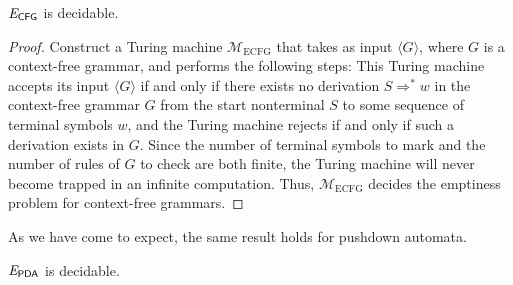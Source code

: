 \begin{theorem}\label{thm:ECFGdecidable}
$\mathit{E}_{\textsf{CFG}}$ is decidable.

\begin{proof}
Construct a Turing machine $\mathcal{M}_{\mathrm{ECFG}}$ that takes as input $\langle G \rangle$, where $G$ is a context-free grammar, and performs the following steps:
This Turing machine accepts its input $\langle G \rangle$ if and only if there exists no derivation $S \Rightarrow^{*} w$ in the context-free grammar $G$ from the start nonterminal $S$ to some sequence of terminal symbols $w$, and the Turing machine rejects if and only if such a derivation exists in $G$. Since the number of terminal symbols to mark and the number of rules of $G$ to check are both finite, the Turing machine will never become trapped in an infinite computation. Thus, $\mathcal{M}_{\mathrm{ECFG}}$ decides the emptiness problem for context-free grammars.
\end{proof}
\end{theorem}

As we have come to expect, the same result holds for pushdown automata.

\begin{corollary}
$\mathit{E}_{\textsf{PDA}}$ is decidable.
\end{corollary}